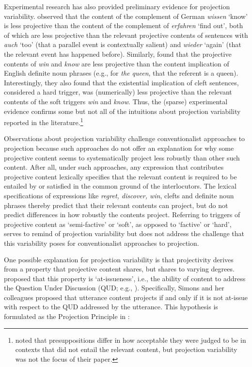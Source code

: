 \documentclass[11pt,fleqn]{article}
\newcommand{\6}{\mbox{$[\hspace*{-.6mm}[$}}
\newcommand{\9}{\mbox{$]\hspace*{-.6mm}]$}}
\begin{document}
Experimental research has also provided preliminary evidence for projection variability. \citet{xue-onea11} observed that the content of the complement of German {\em wissen} `know' is less projective than the content of the complement of {\em erfahren} `find out', both of which are less projective than the relevant projective contents of sentences with {\em auch} `too' (that a parallel event is contextually salient) and {\em wieder} `again' (that the relevant event has happened before). Similarly, \citet{smith-hall11} found that the projective contents of {\em win} and {\em know} are less projective than the content implication of English definite noun phrases (e.g., for {\em the queen}, that the referent is a queen). Interestingly, they also found that the existential implication of cleft sentences, considered a hard trigger, was (numerically) less projective than the relevant contents of the soft triggers {\em win} and {\em know}. Thus, the (sparse) experimental evidence confirms some but not all of the intuitions about projection variability reported in the literature.\footnote{\citet{tiemann-etal11} noted that presuppositions differ in how acceptable they were judged to be in contexts that did not entail the relevant content, but projection variability was not the focus of their paper.}

Observations about projection variability challenge conventionalist approaches to projection because such approaches do not offer an explanation for why some projective content seems to systematically project less robustly than other such content. After all, under such approaches, any expression that contributes projective content lexically specifies that the relevant content is required to be entailed by or satisfied in the common ground of the interlocutors. The lexical specifications of expressions like {\em regret, discover, win}, clefts and definite noun phrases thereby predict that their relevant contents can project, but do not predict differences in how robustly the contents project. Referring to triggers of projective content as `semi-factive' or `soft', as opposed to `factive' or `hard', serves to remind of projection variability but does not address the challenge that this variability poses for conventionalist approaches to projection.

One possible explanation for projection variability is that projectivity derives from a property that projective content shares, but shares to varying degrees. \citet{brst-salt10} proposed that this property is `at-issueness', i.e., the ability of content to address the Question Under Discussion (QUD; e.g., \citealt{roberts12}).  Specifically, Simons and her colleagues proposed that utterance content projects if and only if it is not at-issue with respect to the QUD addressed by the utterance. This hypothesis is formulated as the Projection Principle in \citealt[280]{brst-ar}:
\end{document}
